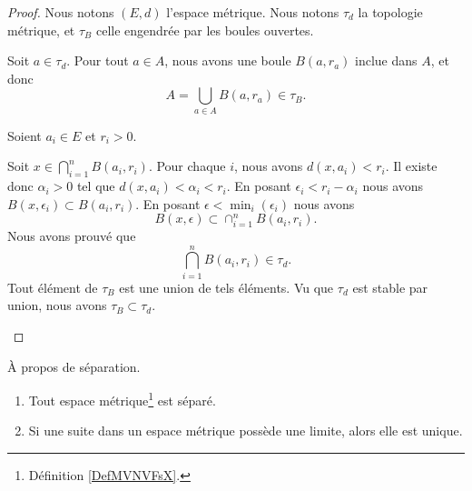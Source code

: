 \begin{proof}
	Nous notons \( (E,d)\) l'espace métrique. Nous notons \( \tau_d\) la topologie métrique, et \( \tau_B\) celle engendrée par les boules ouvertes.
	\begin{subproof}
		Soit \( a\in\tau_d\). Pour tout \( a\in A\), nous avons une boule \( B(a,r_a)\) inclue dans \( A\), et donc
		\begin{equation}
			A=\bigcup_{a\in A}B(a,r_a)\in \tau_B.
		\end{equation}

		Soient \( a_i\in E\) et \( r_i>0\).

		\begin{subproof}
			\spitem[\( \bigcap_{i=1}^nB(a_i,r_i)\in \tau_d\)]
			Soit \( x\in\bigcap_{i=1}^nB(a_i,r_i)\). Pour chaque \( i\), nous avons \( d(x,a_i)<r_i\). Il existe donc \( \alpha_i>0\) tel que \( d(x,a_i)<\alpha_i<r_i\). En posant \( \epsilon_i<r_i-\alpha_i\) nous avons \( B(x,\epsilon_i)\subset B(a_i,r_i)\). En posant \( \epsilon<\min_i(\epsilon_i)\) nous avons
			\begin{equation}
				B(x,\epsilon)\subset\cap_{i=1}^nB(a_i,r_i).
			\end{equation}
			\spitem[Et donc]
			Nous avons prouvé que
			\begin{equation}
				\bigcap_{i=1}^nB(a_i,r_i)\in\tau_d.
			\end{equation}
			Tout élément de \( \tau_B\) est une union de tels éléments. Vu que \( \tau_d\) est stable par union, nous avons \( \tau_B\subset\tau_d\).
		\end{subproof}
	\end{subproof}
\end{proof}

\begin{proposition}
	À propos de séparation.
	\begin{enumerate}
		\item
		      Tout espace métrique\footnote{Définition \ref{DefMVNVFsX}.} est séparé.
		\item
		      Si une suite dans un espace métrique possède une limite, alors elle est unique.
	\end{enumerate}
\end{proposition}

